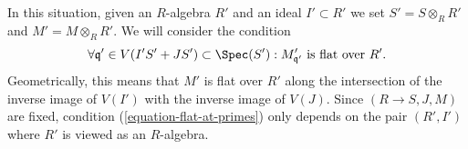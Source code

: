 In this situation, given an $R$-algebra $R'$ and an ideal $I' \subset R'$
we set $S' = S \otimes_R R'$ and $M' = M \otimes_R R'$.
We will consider the condition
\begin{equation}
\label{equation-flat-at-primes}
\forall \mathfrak q' \in V(I'S' + JS') \subset \Spec(S') :
M'_{\mathfrak q'}\text{ is flat over }R'.
\end{equation}
Geometrically, this means that $M'$ is flat over $R'$ along the intersection
of the inverse image of $V(I')$ with the inverse image of $V(J)$.
Since $(R \to S, J, M)$ are fixed, condition (\ref{equation-flat-at-primes})
only depends on the pair $(R', I')$ where $R'$ is viewed as an $R$-algebra.
